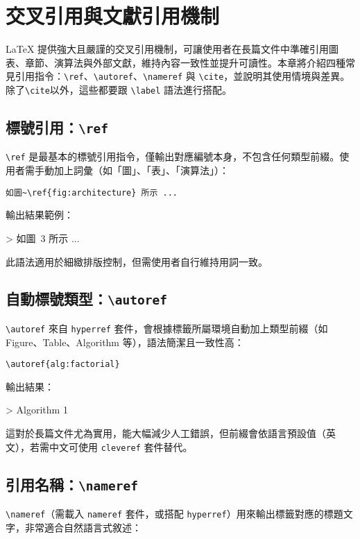 \chapter{交叉引用與文獻引用機制}
\label{chap5}

LaTeX 提供強大且嚴謹的交叉引用機制，可讓使用者在長篇文件中準確引用圖表、章節、演算法與外部文獻，維持內容一致性並提升可讀性。本章將介紹四種常見引用指令：\verb|\ref|、\verb|\autoref|、\verb|\nameref| 與 \verb|\cite|，並說明其使用情境與差異。除了\verb|\cite|以外，這些都要跟 \verb|\label| 語法進行搭配。

\section{標號引用：\texttt{\textbackslash ref}}

\verb|\ref| 是最基本的標號引用指令，僅輸出對應編號本身，不包含任何類型前綴。使用者需手動加上詞彙（如「圖」、「表」、「演算法」）：

\begin{verbatim}
如圖~\ref{fig:architecture} 所示 ...
\end{verbatim}

輸出結果範例：

> 如圖~3 所示 ...

此語法適用於細緻排版控制，但需使用者自行維持用詞一致。

\section{自動標號類型：\texttt{\textbackslash autoref}}

\verb|\autoref| 來自 \texttt{hyperref} 套件，會根據標籤所屬環境自動加上類型前綴（如 Figure、Table、Algorithm 等），語法簡潔且一致性高：

\begin{verbatim}
\autoref{alg:factorial}
\end{verbatim}

輸出結果：

> Algorithm 1

這對於長篇文件尤為實用，能大幅減少人工錯誤，但前綴會依語言預設值（英文），若需中文可使用 \texttt{cleveref} 套件替代。

\section{引用名稱：\texttt{\textbackslash nameref}}

\verb|\nameref|（需載入 \texttt{nameref} 套件，或搭配 \texttt{hyperref}）用來輸出標籤對應的標題文字，非常適合自然語言式敘述：

